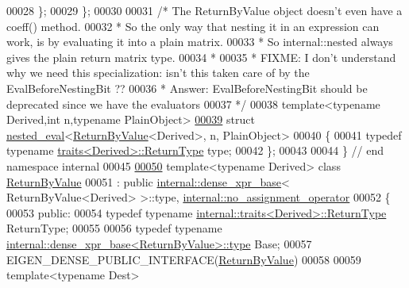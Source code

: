 \begin{DoxyCode}
00028   \};
00029 \};
00030 
00031 \textcolor{comment}{/* The ReturnByValue object doesn't even have a coeff() method.}
00032 \textcolor{comment}{ * So the only way that nesting it in an expression can work, is by evaluating it into a plain matrix.}
00033 \textcolor{comment}{ * So internal::nested always gives the plain return matrix type.}
00034 \textcolor{comment}{ *}
00035 \textcolor{comment}{ * FIXME: I don't understand why we need this specialization: isn't this taken care of by the
       EvalBeforeNestingBit ??}
00036 \textcolor{comment}{ * Answer: EvalBeforeNestingBit should be deprecated since we have the evaluators}
00037 \textcolor{comment}{ */}
00038 \textcolor{keyword}{template}<\textcolor{keyword}{typename} Derived,\textcolor{keywordtype}{int} n,\textcolor{keyword}{typename} PlainObject>
\hyperlink{struct_eigen_1_1internal_1_1nested__eval_3_01_return_by_value_3_01_derived_01_4_00_01n_00_01_plain_object_01_4}{00039} \textcolor{keyword}{struct }\hyperlink{struct_eigen_1_1internal_1_1nested__eval}{nested\_eval}<\hyperlink{group___core___module_class_eigen_1_1_return_by_value}{ReturnByValue}<Derived>, n, PlainObject>
00040 \{
00041   \textcolor{keyword}{typedef} \textcolor{keyword}{typename} \hyperlink{struct_eigen_1_1internal_1_1traits}{traits<Derived>::ReturnType} type;
00042 \};
00043 
00044 \} \textcolor{comment}{// end namespace internal}
00045 
\hyperlink{group___core___module}{00050} \textcolor{keyword}{template}<\textcolor{keyword}{typename} Derived> \textcolor{keyword}{class }\hyperlink{group___core___module_class_eigen_1_1_return_by_value}{ReturnByValue}
00051   : \textcolor{keyword}{public} \hyperlink{struct_eigen_1_1internal_1_1dense__xpr__base}{internal::dense\_xpr\_base}< ReturnByValue<Derived> >::type, 
      \hyperlink{class_eigen_1_1internal_1_1no__assignment__operator}{internal::no\_assignment\_operator}
00052 \{
00053   \textcolor{keyword}{public}:
00054     \textcolor{keyword}{typedef} \textcolor{keyword}{typename} \hyperlink{struct_eigen_1_1internal_1_1traits}{internal::traits<Derived>::ReturnType} ReturnType;
00055 
00056     \textcolor{keyword}{typedef} \textcolor{keyword}{typename} \hyperlink{struct_eigen_1_1internal_1_1dense__xpr__base}{internal::dense\_xpr\_base<ReturnByValue>::type}
       Base;
00057     EIGEN\_DENSE\_PUBLIC\_INTERFACE(\hyperlink{group___core___module_class_eigen_1_1_return_by_value}{ReturnByValue})
00058 
00059     \textcolor{keyword}{template}<\textcolor{keyword}{typename} Dest>

\end{DoxyCode}
